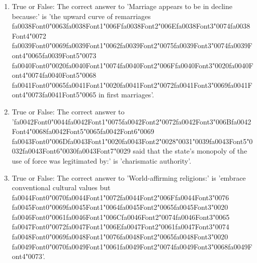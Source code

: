 \documentclass[12pt]{article}
\begin{document}
\begin{enumerate}[label=\arabic*.]
\item True or False: The correct answer to 'Marriage appears to be in decline because:' is 'the upward curve of remarriages {\csname fa0038Font0\endcsname\char"0063}{\csname fa0038Font1\endcsname\char"006F}{\csname fa0038Font2\endcsname\char"006E}{\csname fa0038Font3\endcsname\char"0074}{\csname fa0038Font4\endcsname\char"0072} {\csname fa0039Font0\endcsname\char"0069}{\csname fa0039Font1\endcsname\char"0062}{\csname fa0039Font2\endcsname\char"0075}{\csname fa0039Font3\endcsname\char"0074}{\csname fa0039Font4\endcsname\char"0065}{\csname fa0039Font5\endcsname\char"0073} {\csname fa0040Font0\endcsname\char"0020}{\csname fa0040Font1\endcsname\char"0074}{\csname fa0040Font2\endcsname\char"006F}{\csname fa0040Font3\endcsname\char"0020}{\csname fa0040Font4\endcsname\char"0074}{\csname fa0040Font5\endcsname\char"0068} {\csname fa0041Font0\endcsname\char"0065}{\csname fa0041Font1\endcsname\char"0020}{\csname fa0041Font2\endcsname\char"0072}{\csname fa0041Font3\endcsname\char"0069}{\csname fa0041Font4\endcsname\char"0073}{\csname fa0041Font5\endcsname\char"0065} in first marriages'.
\item True or False: The correct answer to '{\csname fa0042Font0\endcsname\char"0044}{\csname fa0042Font1\endcsname\char"0075}{\csname fa0042Font2\endcsname\char"0072}{\csname fa0042Font3\endcsname\char"006B}{\csname fa0042Font4\endcsname\char"0068}{\csname fa0042Font5\endcsname\char"0065}{\csname fa0042Font6\endcsname\char"0069} {\csname fa0043Font0\endcsname\char"006D}{\csname fa0043Font1\endcsname\char"0020}{\csname fa0043Font2\endcsname\char"0028}{\char"0031}{\char"0039}{\csname fa0043Font5\endcsname\char"0032}{\csname fa0043Font6\endcsname\char"0030}{\csname fa0043Font7\endcsname\char"0029} said that the state's monopoly of the use of force was legitimated by:' is 'charismatic authority'.
\item True or False: The correct answer to 'World-affirming religions:' is 'embrace conventional cultural values but {\csname fa0044Font0\endcsname\char"0070}{\csname fa0044Font1\endcsname\char"0072}{\csname fa0044Font2\endcsname\char"006F}{\csname fa0044Font3\endcsname\char"0076} {\csname fa0045Font0\endcsname\char"0069}{\csname fa0045Font1\endcsname\char"0064}{\csname fa0045Font2\endcsname\char"0065}{\csname fa0045Font3\endcsname\char"0020} {\csname fa0046Font0\endcsname\char"0061}{\csname fa0046Font1\endcsname\char"006C}{\csname fa0046Font2\endcsname\char"0074}{\csname fa0046Font3\endcsname\char"0065} {\csname fa0047Font0\endcsname\char"0072}{\csname fa0047Font1\endcsname\char"006E}{\csname fa0047Font2\endcsname\char"0061}{\csname fa0047Font3\endcsname\char"0074} {\csname fa0048Font0\endcsname\char"0069}{\csname fa0048Font1\endcsname\char"0076}{\csname fa0048Font2\endcsname\char"0065}{\csname fa0048Font3\endcsname\char"0020} {\csname fa0049Font0\endcsname\char"0070}{\csname fa0049Font1\endcsname\char"0061}{\csname fa0049Font2\endcsname\char"0074}{\csname fa0049Font3\endcsname\char"0068}{\csname fa0049Font4\endcsname\char"0073}'.

\end{enumerate}
\end{document}
